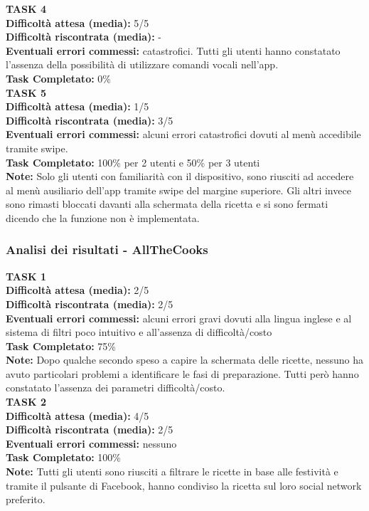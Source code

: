 \textbf{TASK 4}\\
\textbf{Difficoltà attesa (media):} 5/5\\
\textbf{Difficoltà riscontrata (media):} -\\
\textbf{Eventuali errori commessi:} catastrofici. Tutti gli utenti hanno constatato l'assenza della possibilità di utilizzare comandi vocali nell'app.\\
\textbf{Task Completato:} 0\%\\

\textbf{TASK 5}\\
\textbf{Difficoltà attesa (media):} 1/5\\
\textbf{Difficoltà riscontrata (media):} 3/5\\
\textbf{Eventuali errori commessi:} alcuni errori catastrofici dovuti al menù accedibile tramite swipe.\\
\textbf{Task Completato:} 100\% per 2 utenti e 50\% per 3 utenti\\
\textbf{Note:} Solo gli utenti con familiarità con il dispositivo, sono riusciti ad accedere al menù ausiliario dell'app tramite swipe del margine superiore. Gli altri invece sono rimasti bloccati davanti alla schermata della ricetta e si sono fermati dicendo che la funzione non è implementata.\\

\subsubsection*{Analisi dei risultati - AllTheCooks}
\textbf{TASK 1}\\
\textbf{Difficoltà attesa (media):} 2/5\\
\textbf{Difficoltà riscontrata (media):} 2/5\\
\textbf{Eventuali errori commessi:} alcuni errori gravi dovuti alla lingua inglese e al sistema di filtri poco intuitivo e all'assenza di difficoltà/costo\\
\textbf{Task Completato:} 75\%\\
\textbf{Note:} Dopo qualche secondo speso a capire la schermata delle ricette, nessuno ha avuto particolari problemi a identificare le fasi di preparazione. Tutti però hanno constatato l'assenza dei parametri difficoltà/costo.\\

\textbf{TASK 2}\\
\textbf{Difficoltà attesa (media):} 4/5\\
\textbf{Difficoltà riscontrata (media):} 2/5\\
\textbf{Eventuali errori commessi:} nessuno\\
\textbf{Task Completato:} 100\%\\
\textbf{Note:} Tutti gli utenti sono riusciti a filtrare le ricette in base alle festività e tramite il pulsante di Facebook, hanno condiviso la ricetta sul loro social network preferito.\\

